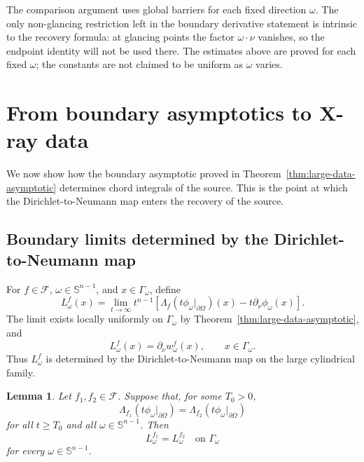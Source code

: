 \documentclass[11pt]{article}
\numberwithin{equation}{section}
\newtheorem{lemma}[theorem]{Lemma}
\newcommand{\Sn}{\mathbb S^{n-1}}
\newcommand{\bd}{\partial}
\newcommand{\Om}{\Omega}
\newcommand{\DN}{\Lambda}
\begin{document}
The comparison argument uses global barriers for each fixed direction \(\omega\).  The only non-glancing restriction left in the boundary derivative statement is intrinsic to the recovery formula: at glancing points the factor \(\omega\cdot\nu\) vanishes, so the endpoint identity will not be used there.  The estimates above are proved for each fixed \(\omega\); the constants are not claimed to be uniform as \(\omega\) varies.


\section{From boundary asymptotics to X-ray data}\label{sec:recovery-line-integrals}

We now show how the boundary asymptotic proved in Theorem~\ref{thm:large-data-asymptotic} determines chord integrals of the source.  This is the point at which the Dirichlet-to-Neumann map enters the recovery of the source.

\subsection{Boundary limits determined by the Dirichlet-to-Neumann map}\label{subsec:boundary-limits}

For \(f\in\mathcal F\), \(\omega\in\Sn\), and \(x\in\Gamma_\omega\), define
\begin{equation}\label{eq:L-omega}
    L_\omega^f(x)
    =
    \lim_{t\to\infty}
    t^{n-1}
    \left[
        \DN_f(t\phi_\omega|_{\bd\Om})(x)
        -
        t\partial_\nu\phi_\omega(x)
    \right].
\end{equation}
The limit exists locally uniformly on \(\Gamma_\omega\) by Theorem~\ref{thm:large-data-asymptotic}, and
\begin{equation}\label{eq:L-omega-normal}
    L_\omega^f(x)=\partial_\nu w_\omega^f(x),
    \qquad x\in\Gamma_\omega .
\end{equation}
Thus \(L_\omega^f\) is determined by the Dirichlet-to-Neumann map on the large cylindrical family.

\begin{lemma}\label{lem:DN-equality-L}
Let \(f_1,f_2\in\mathcal F\).  Suppose that, for some \(T_0>0\),
\[
    \DN_{f_1}(t\phi_\omega|_{\bd\Om})
    =
    \DN_{f_2}(t\phi_\omega|_{\bd\Om})
\]
for all \(t\ge T_0\) and all \(\omega\in\Sn\).  Then
\[
    L_\omega^{f_1}=L_\omega^{f_2}
    \quad\text{on }\Gamma_\omega
\]
for every \(\omega\in\Sn\).
\end{lemma}
\end{document}
